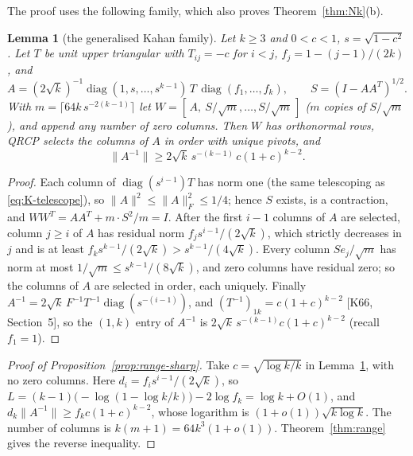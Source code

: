 \documentclass[11pt,a4paper]{article}
\newtheorem{lemma}[theorem]{Lemma}
\theoremstyle{definition}
\numberwithin{equation}{section}
\begin{document}
The proof uses the following family, which also proves Theorem~\ref{thm:Nk}(b).

\begin{lemma}[the generalised Kahan family]\label{lem:kahan-family}
Let $k\ge3$ and $0<c<1$, $s=\sqrt{1-c^2}$. Let $T$ be unit upper triangular with $T_{ij}=-c$ for $i<j$,
$f_j=1-(j-1)/(2k)$, and
\[
 A=(2\sqrt k)^{-1}\operatorname{diag}(1,s,\dots,s^{k-1})\,T\,\operatorname{diag}(f_1,\dots,f_k),\qquad
 S=(I-AA^T)^{1/2}.
\]
With $m=\lceil64k\,s^{-2(k-1)}\rceil$ let $W=[\,A,\ S/\sqrt m,\dots,S/\sqrt m\,]$ ($m$ copies of $S/\sqrt m$), and
append any number of zero columns. Then $W$ has orthonormal rows, QRCP selects the columns of $A$ in order with unique
pivots, and
\begin{equation}\label{eq:kahan-gamma}
 \|A^{-1}\|\ge2\sqrt k\,s^{-(k-1)}\,c(1+c)^{k-2}.
\end{equation}
\end{lemma}

\begin{proof}
Each column of $\operatorname{diag}(s^{i-1})T$ has norm one (the same telescoping as \eqref{eq:K-telescope}), so
$\|A\|^2\le\|A\|_F^2\le1/4$; hence $S$ exists, is a contraction, and $WW^T=AA^T+m\cdot S^2/m=I$. After the first
$i-1$ columns of $A$ are selected, column $j\ge i$ of $A$ has residual norm $f_js^{i-1}/(2\sqrt k)$, which strictly
decreases in $j$ and is at least $f_ks^{k-1}/(2\sqrt k)>s^{k-1}/(4\sqrt k)$. Every column $S e_j/\sqrt m$ has norm at
most $1/\sqrt m\le s^{k-1}/(8\sqrt k)$, and zero columns have residual zero; so the columns of $A$ are selected in
order, each uniquely. Finally $A^{-1}=2\sqrt k\,F^{-1}T^{-1}\operatorname{diag}(s^{-(i-1)})$, and
$(T^{-1})_{1k}=c(1+c)^{k-2}$ [K66, Section~5], so the $(1,k)$ entry of $A^{-1}$ is
$2\sqrt k\,s^{-(k-1)}c(1+c)^{k-2}$ (recall $f_1=1$).
\end{proof}

\begin{proof}[Proof of Proposition~\ref{prop:range-sharp}]
Take $c=\sqrt{\log k/k}$ in Lemma~\ref{lem:kahan-family}, with no zero columns. Here $d_i=f_is^{i-1}/(2\sqrt k)$,
so $L=(k-1)\bigl(-\log(1-\log k/k)\bigr)-2\log f_k=\log k+O(1)$, and $d_k\|A^{-1}\|\ge f_kc(1+c)^{k-2}$, whose
logarithm is $(1+o(1))\sqrt{k\log k}$. The number of columns is $k(m+1)=64k^3(1+o(1))$. Theorem~\ref{thm:range}
gives the reverse inequality.
\end{proof}
\end{document}
